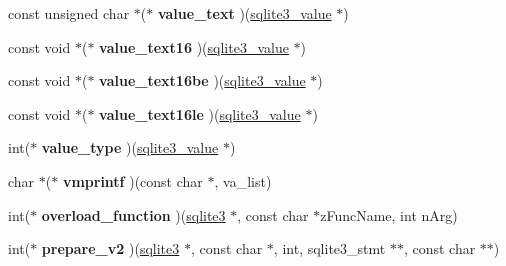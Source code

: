 \begin{DoxyCompactItemize}
\item 
const unsigned char $\ast$($\ast$ {\bfseries value\+\_\+text} )(\hyperlink{structMem}{sqlite3\+\_\+value} $\ast$)\hypertarget{structsqlite3__api__routines_ad2c45a84a69d75d4825cf9366745d851}{}\label{structsqlite3__api__routines_ad2c45a84a69d75d4825cf9366745d851}

\item 
const void $\ast$($\ast$ {\bfseries value\+\_\+text16} )(\hyperlink{structMem}{sqlite3\+\_\+value} $\ast$)\hypertarget{structsqlite3__api__routines_afa0733fdea9bf31eb0262640f05e197e}{}\label{structsqlite3__api__routines_afa0733fdea9bf31eb0262640f05e197e}

\item 
const void $\ast$($\ast$ {\bfseries value\+\_\+text16be} )(\hyperlink{structMem}{sqlite3\+\_\+value} $\ast$)\hypertarget{structsqlite3__api__routines_aff98dceb24b5226c1b81b04506db7f3a}{}\label{structsqlite3__api__routines_aff98dceb24b5226c1b81b04506db7f3a}

\item 
const void $\ast$($\ast$ {\bfseries value\+\_\+text16le} )(\hyperlink{structMem}{sqlite3\+\_\+value} $\ast$)\hypertarget{structsqlite3__api__routines_a80c9dbe09291dea5e2aacc158b8d88f1}{}\label{structsqlite3__api__routines_a80c9dbe09291dea5e2aacc158b8d88f1}

\item 
int($\ast$ {\bfseries value\+\_\+type} )(\hyperlink{structMem}{sqlite3\+\_\+value} $\ast$)\hypertarget{structsqlite3__api__routines_a682549a9b9c8d95f9dcee8428cd25377}{}\label{structsqlite3__api__routines_a682549a9b9c8d95f9dcee8428cd25377}

\item 
char $\ast$($\ast$ {\bfseries vmprintf} )(const char $\ast$, va\+\_\+list)\hypertarget{structsqlite3__api__routines_adc97011a4bf13413e1a9a0e1ab5e1d97}{}\label{structsqlite3__api__routines_adc97011a4bf13413e1a9a0e1ab5e1d97}

\item 
int($\ast$ {\bfseries overload\+\_\+function} )(\hyperlink{structsqlite3}{sqlite3} $\ast$, const char $\ast$z\+Func\+Name, int n\+Arg)\hypertarget{structsqlite3__api__routines_aae9b181f076ae18804590924aa791101}{}\label{structsqlite3__api__routines_aae9b181f076ae18804590924aa791101}

\item 
int($\ast$ {\bfseries prepare\+\_\+v2} )(\hyperlink{structsqlite3}{sqlite3} $\ast$, const char $\ast$, int, sqlite3\+\_\+stmt $\ast$$\ast$, const char $\ast$$\ast$)\hypertarget{structsqlite3__api__routines_adf1956e4240b4573ec5d1c0e079a0dc2}{}\label{structsqlite3__api__routines_adf1956e4240b4573ec5d1c0e079a0dc2}


\end{DoxyCompactItemize}
